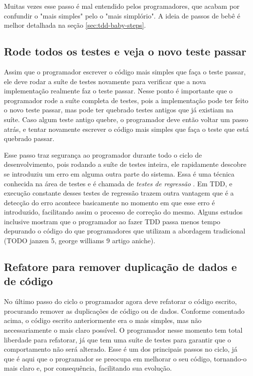 Muitas vezes esse passo é mal entendido pelos programadores, que acabam por confundir o "mais simples" pelo o "mais simplório". 
A ideia de passos de bebê \cite{TDDByExample} é melhor detalhada na seção \ref{sec:tdd-baby-steps}.

\subsection{Rode todos os testes e veja o novo teste passar}

Assim que o programador escrever o código mais simples que faça o teste passar, ele deve rodar a suíte de testes novamente
para verificar que a nova implementação realmente faz o teste passar. Nesse ponto é importante que o programador rode a suíte 
completa de testes, pois a implementação pode ter feito o novo teste passar, mas pode ter quebrado testes antigos que já existiam na suíte. 
Caso algum teste antigo quebre, o programador deve então voltar um passo atrás, e tentar novamente escrever o código mais simples
que faça o teste que está quebrado passar.

Esse passo traz segurança ao programador durante todo o ciclo de desenvolvimento, pois rodando a suíte de testes inteira, 
ele rapidamente descobre se introduziu um erro em alguma outra parte do sistema. Essa é uma técnica conhecida na área de testes e é
chamada de \textit{testes de regressão} \cite{art-of-sw-testing}. Em TDD, e execução constante desses testes de regressão 
trazem outra vantagem que é a detecção do erro acontece basicamente no momento em que esse erro é introduzido, facilitando assim
o processo de correção do mesmo. Alguns estudos inclusive mostram que o programador ao fazer TDD passa menos tempo depurando o código
do que programadores que utilizam a abordagem tradicional (TODO janzen 5, george williams 9 artigo aniche).

\subsection{Refatore para remover duplicação de dados e de código}

No último passo do ciclo o programador agora deve refatorar o código escrito, procurando remover as duplicações de código ou de dados. 
Conforme comentado acima, o código escrito anteriormente era o mais simples, mas não necessariamente o mais claro possível. O programador
nesse momento tem total liberdade para refatorar, já que tem uma suíte de testes para garantir que o comportamento não será alterado.
Esse é um dos principais passos no ciclo, já que é aqui que o programador se preocupa em melhorar o seu código, tornando-o
mais claro e, por consequência, facilitando sua evolução.

